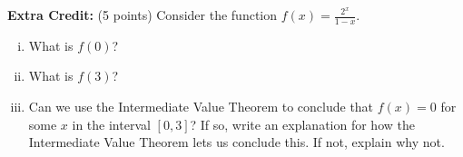 \documentclass[12pt]{article}
\renewcommand{\emph}[1]{\textsf{\textbf{#1}}}
\begin{document}
\newpage


\emph{Extra Credit: }(5 points) Consider the function $\displaystyle f(x)=\frac{2^x}{1-x}$.\\
\begin{enumerate}[i.]
\item What is $f(0)$?
\vspace{1in}
\item What is $f(3)$?
\vspace{1in}
\item Can we use the Intermediate Value Theorem to conclude that $f(x) = 0$ for some $x$ in the interval $[0,3]$? If so, write an explanation for how the Intermediate Value Theorem lets us conclude this. If not, explain why not.
\vfill
\end{enumerate}

\vfill



\vfill
\end{document}
